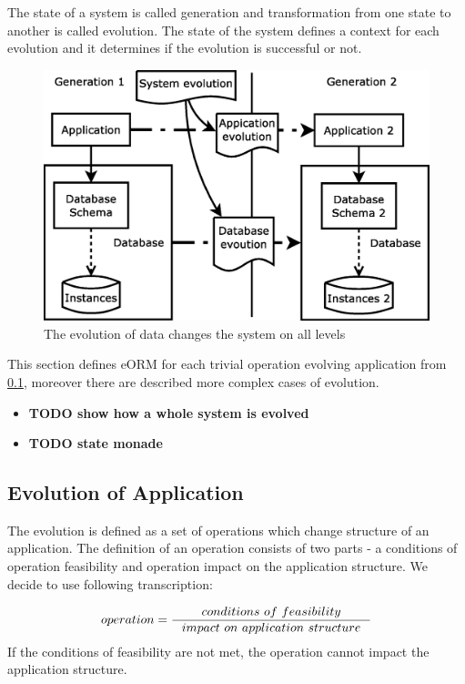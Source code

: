 \documentclass[11pt]{article}
\begin{document}
The state of a system is called generation and transformation from one state to another is called evolution. The state of the system defines a context for each evolution and it determines if the evolution is successful or not. 

\begin{figure}
\begin{center}
	\includegraphics[scale=0.4]{./images/evolution}
	\caption{The evolution of data changes the system on all levels}
\end{center}
	\label{fig:evolution}
\end{figure}

This section defines eORM for each trivial operation evolving application from \ref{sec:appEvolution}, moreover there are described more complex cases of evolution. 

\begin{itemize}
	\item \textbf{TODO show how a whole system is evolved}
	\item \textbf{TODO state monade}
\end{itemize}


\subsection{Evolution of Application}
\label{sec:appEvolution}

The evolution is defined as a set of operations which change structure of an application. The definition of an operation consists of two parts - a conditions of operation feasibility and operation impact on the application structure. We decide to use following transcription:

$$
operation = \inference{conditions$ $of$ $feasibility}{impact$ $on$ $application$ $structure}
$$
If the conditions of feasibility are not met, the operation cannot impact the application structure.
\end{document}
